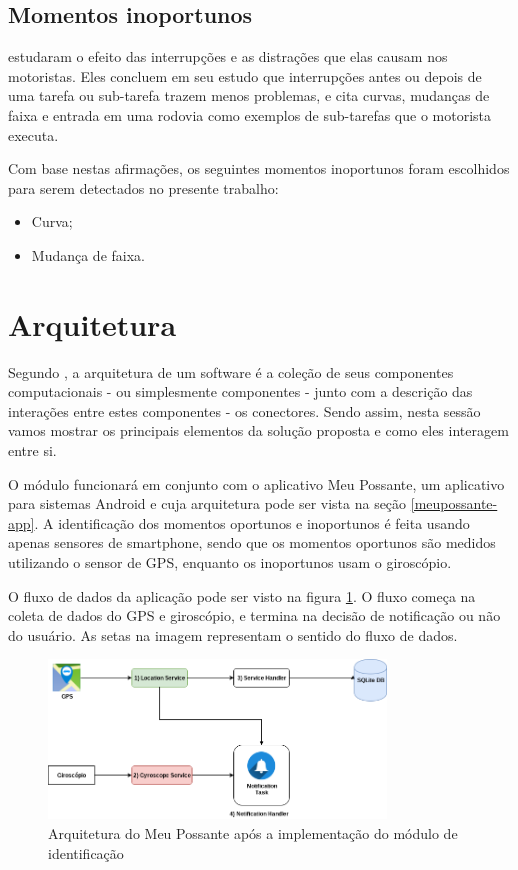 \subsection{Momentos inoportunos}
\label{subsec-momentos-inoportunos}

 estudaram o efeito das interrupções e as distrações que elas causam nos motoristas. Eles concluem
em seu estudo que interrupções antes ou depois de uma tarefa ou sub-tarefa trazem menos problemas, e cita curvas, mudanças
de faixa e entrada em uma rodovia como exemplos de sub-tarefas que o motorista executa.

Com base nestas afirmações, os seguintes momentos inoportunos foram escolhidos para serem detectados no presente trabalho:

\begin{itemize}
  \item Curva;
  \item Mudança de faixa.
\end{itemize}

\section{Arquitetura}
\label{sec-arquitetura-solucao}
Segundo , a arquitetura de um software é a coleção de seus componentes computacionais - ou simplesmente
componentes - junto com a descrição das interações entre estes componentes - os conectores.  Sendo assim, nesta sessão
vamos mostrar os principais elementos da solução proposta e como eles interagem entre si.

O módulo funcionará em conjunto com o aplicativo Meu Possante, um aplicativo para sistemas Android e cuja arquitetura pode ser vista
na seção \ref{meupossante-app}. A identificação dos momentos oportunos e inoportunos é feita usando apenas sensores de smartphone,
sendo que os momentos oportunos são medidos utilizando o sensor de GPS, enquanto os inoportunos usam o giroscópio.

O fluxo de dados da aplicação pode ser visto na figura \ref{arquitetura-meu-possante-com-modulo}. O fluxo começa
na coleta de dados do GPS e giroscópio, e termina na decisão de notificação ou não do usuário. As setas na
imagem representam o sentido do fluxo de dados.

\begin{figure}[h]
\centering
\includegraphics[width=0.8\textwidth]{images/arquitetura-meu-possante-com-modulo.png}
\caption{Arquitetura do Meu Possante após a implementação do módulo de identificação}
\label{arquitetura-meu-possante-com-modulo}
\end{figure}

